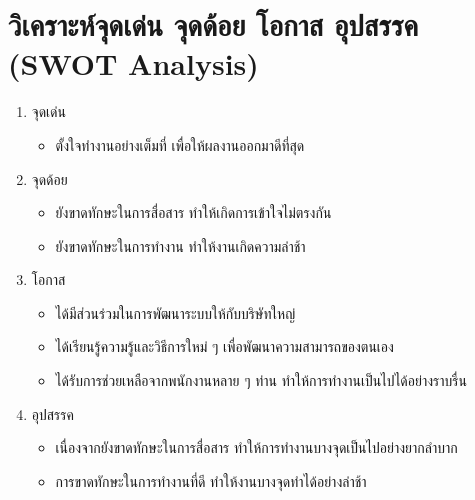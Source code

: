 \section{วิเคราะห์จุดเด่น จุดด้อย โอกาส อุปสรรค (SWOT Analysis)}
\begin{enumerate}
	\item จุดเด่น
	\begin{itemize}
		\item ตั้งใจทำงานอย่างเต็มที่ เพื่อให้ผลงานออกมาดีที่สุด
	\end{itemize}
	\item จุดด้อย
	\begin{itemize}
		\item ยังขาดทักษะในการสื่อสาร ทำให้เกิดการเข้าใจไม่ตรงกัน
		\item ยังขาดทักษะในการทำงาน ทำให้งานเกิดความล่าช้า
	\end{itemize}
	\item โอกาส
	\begin{itemize}
		\item ได้มีส่วนร่วมในการพัฒนาระบบให้กับบริษัทใหญ่
		\item ได้เรียนรู้ความรู้และวิธีการใหม่ ๆ เพื่อพัฒนาความสามารถของตนเอง
		\item ได้รับการช่วยเหลือจากพนักงานหลาย ๆ ท่าน ทำให้การทำงานเป็นไปได้อย่างราบรื่น
	\end{itemize}
	\item อุปสรรค
	\begin{itemize}
		\item เนื่องจากยังขาดทักษะในการสื่อสาร ทำให้การทำงานบางจุดเป็นไปอย่างยากลำบาก
		\item การขาดทักษะในการทำงานที่ดี ทำให้งานบางจุดทำได้อย่างล่าช้า
	\end{itemize}
\end{enumerate}